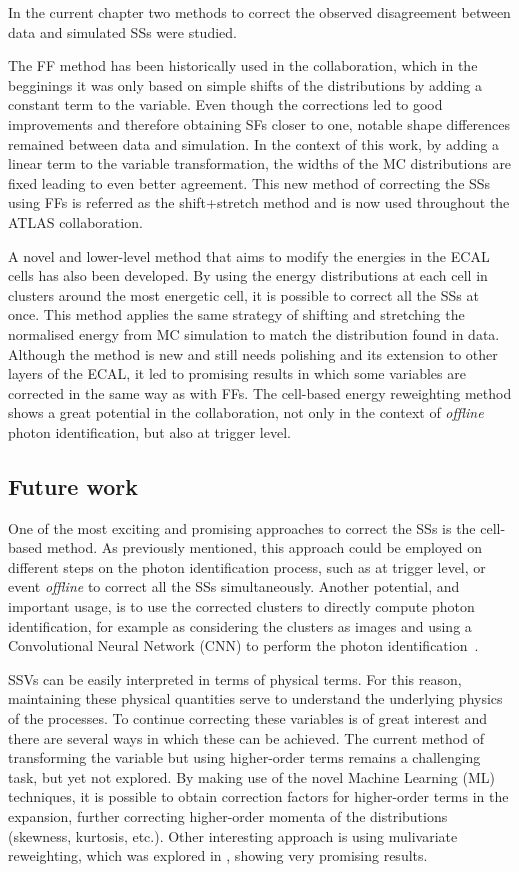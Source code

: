 In the current chapter two methods to correct the observed disagreement between data and simulated \acfp{SS} were studied.

The \acf{FF} method has been historically used in the collaboration, which in the begginings it was only based on simple shifts of the distributions by adding a constant term to the variable. Even though the corrections led to good improvements and therefore obtaining \acfp{SF} closer to one, notable shape differences remained between data and simulation. In the context of this work, by adding a linear term to the variable transformation, the widths of the \ac{MC} distributions are fixed leading to even better agreement. This new method of correcting the \acp{SS} using \acp{FF} is referred as the shift+stretch method and is now used throughout the \ac{ATLAS} collaboration. 

A novel and lower-level method that aims to modify the energies in the \ac{ECAL} cells has also been developed. By using the energy distributions at each cell in clusters around the most energetic cell, it is possible to correct all the \acp{SS} at once. This method applies the same strategy of shifting and stretching the normalised energy from \ac{MC} simulation to match the distribution found in data. Although the method is new and still needs polishing and its extension to other layers of the \ac{ECAL}, it led to promising results in which some variables are corrected in the same way as with \acp{FF}. The cell-based energy reweighting method shows a great potential in the collaboration, not only in the context of \textit{offline} photon identification, but also at trigger level.

\subsection{Future work}

One of the most exciting and promising approaches to correct the \acp{SS} is the cell-based method. As previously mentioned, this approach could be employed on different steps on the photon identification process, such as at trigger level, or event \textit{offline} to correct all the \acp{SS} simultaneously. Another potential, and important usage, is to use the corrected clusters to directly compute photon identification, for example as considering the clusters as images and using a Convolutional Neural Network (CNN) to perform the photon identification~\cite{thesis_belfkir}.

\acfp{SSV} can be easily interpreted in terms of physical terms. For this reason, maintaining these physical quantities serve to understand the underlying physics of the processes. To continue correcting these variables is of great interest and there are several ways in which these can be achieved. The current method of transforming the variable but using higher-order terms remains a challenging task, but yet not explored. By making use of the novel Machine Learning (ML) techniques, it is possible to obtain correction factors for higher-order terms in the expansion, further correcting higher-order momenta of the distributions (skewness, kurtosis, etc.). Other interesting approach is using mulivariate reweighting, which was explored in , showing very promising results.